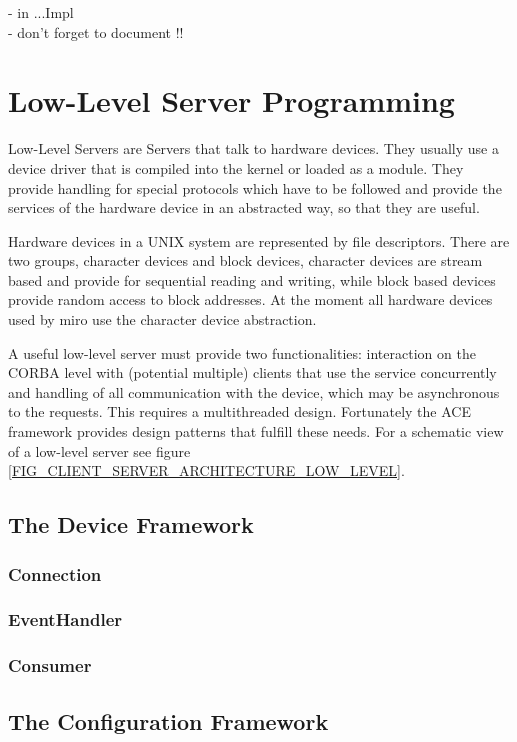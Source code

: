 - in ...Impl \\
- don't forget to document !!


\section{Low-Level Server Programming}

Low-Level Servers are Servers that talk to hardware devices. They
usually use a device driver that is compiled into the kernel or loaded 
as a module. They provide handling for special protocols which have to 
be followed and provide the services of the hardware device in an
abstracted way, so that they are useful.

Hardware devices in a UNIX system are represented by file
descriptors. There are two groups, character devices and block devices,
character devices are stream based and provide for sequential reading
and writing, while block based devices provide random access to block
addresses. At the moment all hardware devices used by miro use the
character device abstraction.

A useful \miro low-level server must provide two functionalities:
interaction on the CORBA level with (potential multiple) clients that
use the service concurrently and handling of all communication with
the device, which may be asynchronous to the requests. This requires a
multithreaded design. Fortunately the ACE framework provides design
patterns that fulfill these needs. For a schematic view of a \miro
low-level server see figure
\ref{FIG_CLIENT_SERVER_ARCHITECTURE_LOW_LEVEL}.


\subsection{The Device Framework}

\subsubsection{Connection}

\subsubsection{EventHandler}

\subsubsection{Consumer}

\subsection{The Configuration Framework}

